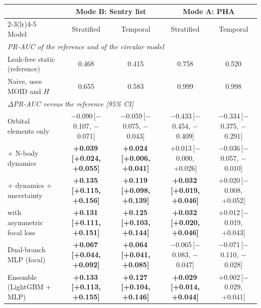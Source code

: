 \begin{tabular}{lcccc}
\toprule
 & \multicolumn{2}{c}{Mode B: Sentry list} & \multicolumn{2}{c}{Mode A: PHA}\\
\cmidrule(lr){2-3}\cmidrule(lr){4-5}
Model & Stratified & Temporal & Stratified & Temporal\\
\midrule
\multicolumn{5}{l}{\emph{PR-AUC of the reference and of the circular model}}\\
Leak-free static (reference) & 0.468 & 0.415 & 0.758 & 0.520\\
Naive, uses MOID and $H$ & 0.655 & 0.583 & 0.999 & 0.998\\
\midrule
\multicolumn{5}{l}{\emph{$\Delta$PR-AUC versus the reference [95\% CI]}}\\
Orbital elements only & $-$0.090\,{\scriptsize[$-$0.107, $-$0.071]} & $-$0.059\,{\scriptsize[$-$0.075, $-$0.043]} & $-$0.433\,{\scriptsize[$-$0.454, $-$0.409]} & $-$0.334\,{\scriptsize[$-$0.375, $-$0.291]}\\
+ N-body dynamics & \textbf{+0.039\,{\scriptsize[+0.024, +0.055]}} & \textbf{+0.024\,{\scriptsize[+0.006, +0.041]}} & +0.013\,{\scriptsize[$-$0.000, +0.026]} & $-$0.036\,{\scriptsize[$-$0.057, $-$0.010]}\\
+ dynamics + uncertainty & \textbf{+0.135\,{\scriptsize[+0.115, +0.156]}} & \textbf{+0.119\,{\scriptsize[+0.098, +0.139]}} & \textbf{+0.032\,{\scriptsize[+0.019, +0.046]}} & +0.020\,{\scriptsize[$-$0.008, +0.052]}\\
\quad with asymmetric focal loss & \textbf{+0.131\,{\scriptsize[+0.111, +0.151]}} & \textbf{+0.125\,{\scriptsize[+0.103, +0.144]}} & \textbf{+0.032\,{\scriptsize[+0.020, +0.046]}} & +0.012\,{\scriptsize[$-$0.019, +0.043]}\\
Dual-branch MLP (focal) & \textbf{+0.067\,{\scriptsize[+0.044, +0.092]}} & \textbf{+0.064\,{\scriptsize[+0.041, +0.085]}} & $-$0.065\,{\scriptsize[$-$0.083, $-$0.047]} & $-$0.071\,{\scriptsize[$-$0.110, $-$0.028]}\\
Ensemble (LightGBM + MLP) & \textbf{+0.133\,{\scriptsize[+0.113, +0.155]}} & \textbf{+0.127\,{\scriptsize[+0.104, +0.146]}} & \textbf{+0.029\,{\scriptsize[+0.014, +0.044]}} & +0.002\,{\scriptsize[$-$0.029, +0.041]}\\
\bottomrule
\end{tabular}
